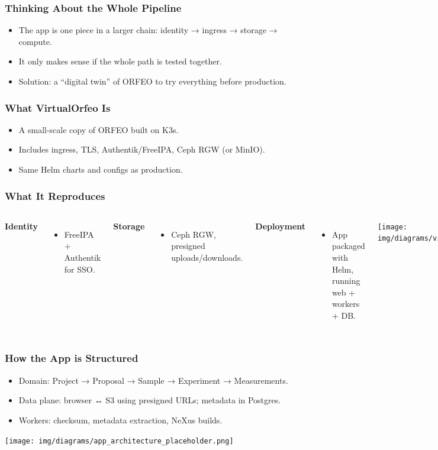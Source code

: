 \documentclass{beamer}
\begin{document}
	\begin{frame}
		\frametitle{Thinking About the Whole Pipeline}
		\begin{itemize}
			\item The app is one piece in a larger chain: identity → ingress → storage → compute.
			\item It only makes sense if the whole path is tested together.
			\item Solution: a “digital twin” of ORFEO to try everything before production.
		\end{itemize}
	\end{frame}
	
	
	\begin{frame}
		\frametitle{What VirtualOrfeo Is}
		\begin{itemize}
			\item A small-scale copy of ORFEO built on K3s.
			\item Includes ingress, TLS, Authentik/FreeIPA, Ceph RGW (or MinIO).
			\item Same Helm charts and configs as production.
		\end{itemize}
	\end{frame}
	
	\begin{frame}
		\frametitle{What It Reproduces}
		\begin{columns}[T,totalwidth=\textwidth]
			\textbf{Identity}
			\begin{itemize}
				\item FreeIPA + Authentik for SSO.
			\end{itemize}
			\textbf{Storage}
			\begin{itemize}
				\item Ceph RGW, presigned uploads/downloads.
			\end{itemize}
			\textbf{Deployment}
			\begin{itemize}
				\item App packaged with Helm, running web + workers + DB.
			\end{itemize}
			\texttt{[image: img/diagrams/virtualorfeo\_topology\_placeholder.png]}
		\end{columns}
	\end{frame}
	
	
	\begin{frame}
		\frametitle{How the App is Structured}
		\begin{itemize}
			\item Domain: Project → Proposal → Sample → Experiment → Measurements.
			\item Data plane: browser ↔ S3 using presigned URLs; metadata in Postgres.
			\item Workers: checksum, metadata extraction, NeXus builds.
		\end{itemize}
		\texttt{[image: img/diagrams/app\_architecture\_placeholder.png]}
	\end{frame}
	
\end{document}
